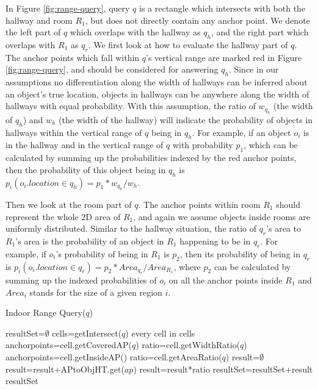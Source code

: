 \documentclass[12pt]{report}
\begin{document}
In Figure \ref{fig:range-query}, query \(q\) is a rectangle which
intersects with both the hallway and room \(R_1\), but does not
directly contain any anchor point.  We denote the left part of
\(q\) which overlaps with the hallway as \(q_h\), and the right
part which overlaps with \(R_1\) as \(q_r\).  We first look at how
to evaluate the hallway part of \(q\).  The anchor points which
fall within \(q\)'s vertical range are marked red in Figure
\ref{fig:range-query}, and should be considered for answering \(q_h\).
Since in our assumptions no differentiation along the width of
hallways can be inferred about an object's true location, objects
in hallways can be anywhere along the width of hallways with equal
probability.  With this assumption, the ratio of \(w_{q_h}\) (the
width of \(q_h\)) and \(w_h\) (the width of the hallway) will
indicate the probability of objects in hallways within the
vertical range of \(q\) being in \(q_h\).  For example, if an
object \(o_i\) is in the hallway and in the vertical range of
\(q\) with probability \(p_1\), which can be calculated by summing
up the probabilities indexed by the red anchor points, then the
probability of this object being in \(q_h\) is
\(p_i(o_i.location\in q_h)=p_1*w_{q_h}/w_h\).

Then we look at the room part of \(q\).  The anchor points within
room \(R_1\) should represent the whole 2D area of \(R_1\), and
again we assume objects inside rooms are uniformly distributed.
Similar to the hallway situation, the ratio of \(q_r\)'s area to
\(R_1\)'s area is the probability of an object in \(R_1\)
happening to be in \(q_r\).  For example, if \(o_i\)'s probability
of being in \(R_1\) is \(p_2\), then its probability of being in
\(q_r\) is \(p_i(o_i.location\in q_r)=p_2*Area_{q_r}/Area_{R_1}\),
where \(p_2\) can be calculated by summing up the indexed
probabilities of \(o_i\) on all the anchor points inside \(R_1\)
and \(Area_i\) stands for the size of a given region \(i\).

\begin{algorithm}[!t]
  \caption{Indoor Range Query(\(q\))}
  \label{alg:range-query}
  \small
  \begin{algorithmic}[1]
    \STATE resultSet=\(\emptyset\) \STATE cells=getIntersect(\(q\)) \FOR
    {every cell in cells}
    \STATE anchorpoints=cell.getCoveredAP(\(q\))
    \STATE ratio=cell.getWidthRatio(\(q\))
    \STATE anchorpoints=cell.getInsideAP()
    \STATE ratio=cell.getAreaRatio(\(q\))
    \ENDIF
    \STATE result=\(\emptyset\)
    \STATE result=result+APtoObjHT.get(\(ap\))
    \ENDFOR
    \STATE result=result*ratio
    \STATE resultSet=resultSet+result
    \ENDFOR \RETURN resultSet
  \end{algorithmic}
\end{algorithm}
\end{document}
